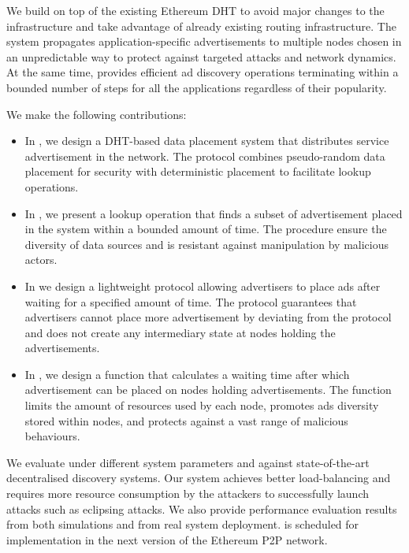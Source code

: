 We build \sysname on top of the existing Ethereum DHT to avoid major changes to the infrastructure and take advantage of already existing routing infrastructure. The system propagates application-specific advertisements to multiple nodes chosen in an unpredictable way to protect against targeted attacks and network dynamics. At the same time, \sysname provides efficient ad discovery operations terminating within a bounded number of steps for all the applications regardless of their popularity.

 We make the following contributions:
\begin{itemize}
    \item In , we design a DHT-based data placement system that distributes service advertisement in the network. The protocol combines pseudo-random data placement for security with deterministic placement to facilitate lookup operations. 
    \item In , we present a lookup operation that finds a subset of advertisement placed in the system within a bounded amount of time. The procedure ensure the diversity of data sources and is resistant against manipulation by malicious actors. 
    \item In  we design a lightweight protocol allowing advertisers to place ads after waiting for a specified amount of time. The protocol guarantees that advertisers cannot place more advertisement by deviating from the protocol and does not create any intermediary state at nodes holding the advertisements. 
    \item In , we design a function that calculates a waiting time after which advertisement can be placed on nodes holding advertisements. The function limits the amount of resources used by each node, promotes ads diversity stored within nodes, and protects against a vast range of malicious behaviours. 
\end{itemize}

We evaluate \sysname under different system parameters and against state-of-the-art decentralised discovery systems. Our system achieves better load-balancing and requires more resource consumption by the attackers to successfully launch attacks such as eclipsing attacks. We also provide performance evaluation results from both simulations and from real system deployment. \sysname is scheduled for implementation in the next version of the Ethereum P2P network. 

